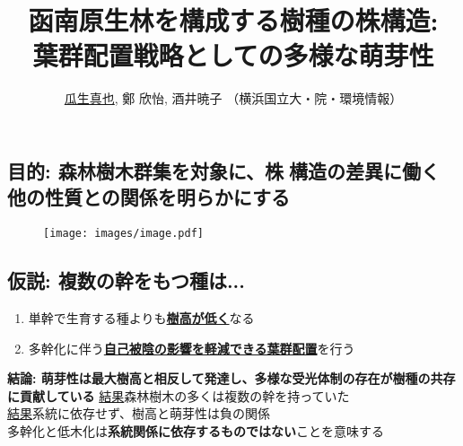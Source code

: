 \documentclass[a0, 36pt, plainboxedsections]{sciposter} %
\title{\textcolor{Blue1}{函南原生林を構成する樹種の株構造:\\\vspace{-0.5em} 葉群配置戦略としての多様な萌芽性}}
\author{\underline{瓜生真也}, 鄭 欣怡, 酒井暁子 （横浜国立大・院・環境情報） \normalsize{\faEnvelope \hspace{0.02em} \fontspec{GillSans-Italic}{suika1127@gmail.com}}}
\begin{document}
\maketitle
\vspace{-2em}
\begin{multicols}{2}
\begin{mdframed}[style=section.frame]
  \centering\huge\textbf{}
\end{mdframed}

\subsection*{目的: 森林樹木群集を対象に、株構造の差異に働く\\他の性質との関係を明らかにする}

\begin{figure}
  \centering\texttt{[image: images/image.pdf]}
\end{figure}

\vspace{-0.8em}
\subsection*{仮説: 複数の幹をもつ種は...}

\begin{enumerate}\setlength{\itemindent}{1em}
\item 単幹で生育する種よりも\underline{\textbf{樹高が低く}}なる
\item 多幹化に伴う\underline{\textbf{自己被陰の影響を軽減できる葉群配置}}を行う
\end{enumerate}

\columnbreak
\begin{mdframed}[style=conclusion.frame]
  \large\textbf{\faFlagAlt \vspace{0.02em} 結論: {萌芽性は最大樹高と相反して発達し、多様な受光体制の存在が樹種の共存に貢献している}} %
  \vspace{0.4em}
  \flushleft
  \normalsize{\underline{結果}森林樹木の多くは複数の幹を持っていた\\
  \underline{結果}系統に依存せず、樹高と萌芽性は負の関係\\
  }
  \large{\faHandLeft \vspace{0.02em} 多幹化と低木化は\textbf{系統関係に依存するものではない}ことを意味する} %
  

\end{mdframed}
\end{multicols}
\end{document}
